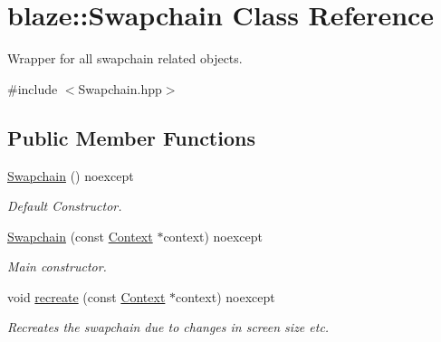 \hypertarget{classblaze_1_1Swapchain}{}\section{blaze\+:\+:Swapchain Class Reference}
\label{classblaze_1_1Swapchain}


Wrapper for all swapchain related objects.  




{\ttfamily \#include $<$Swapchain.\+hpp$>$}

\subsection*{Public Member Functions}
\begin{DoxyCompactItemize}
\item 
\mbox{\label{classblaze_1_1Swapchain_ada1346a550e854f89adc30f47866e585}} 
\hyperlink{classblaze_1_1Swapchain_ada1346a550e854f89adc30f47866e585}{Swapchain} () noexcept
\begin{DoxyCompactList}\small\item\em Default Constructor. \end{DoxyCompactList}\item 
\hyperlink{classblaze_1_1Swapchain_a92cae631c3a1b925686a1836a3b15e09}{Swapchain} (const \hyperlink{classblaze_1_1Context}{Context} $\ast$context) noexcept
\begin{DoxyCompactList}\small\item\em Main constructor. \end{DoxyCompactList}\item 
void \hyperlink{classblaze_1_1Swapchain_a1ab37b70fcc07c5dea24486087011314}{recreate} (const \hyperlink{classblaze_1_1Context}{Context} $\ast$context) noexcept
\begin{DoxyCompactList}\small\item\em Recreates the swapchain due to changes in screen size etc. \end{DoxyCompactList}\end{DoxyCompactItemize}

